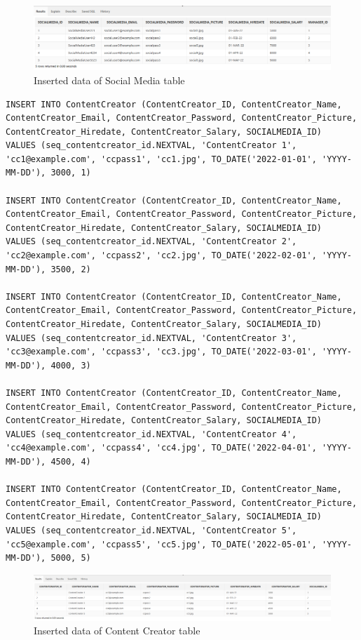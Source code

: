 \begin{figure}[H]
    \centering
    \includegraphics[width=1\textwidth]{images/TableData/SOCIALMEDIA.png}
    \caption{Inserted data of Social Media table}
\end{figure}
\clearpage
\begin{lstlisting}[caption={Inserting data into ContentCreator tables},label={lst:insert_ContentCreator}]
INSERT INTO ContentCreator (ContentCreator_ID, ContentCreator_Name, ContentCreator_Email, ContentCreator_Password, ContentCreator_Picture, ContentCreator_Hiredate, ContentCreator_Salary, SOCIALMEDIA_ID)
VALUES (seq_contentcreator_id.NEXTVAL, 'ContentCreator 1', 'cc1@example.com', 'ccpass1', 'cc1.jpg', TO_DATE('2022-01-01', 'YYYY-MM-DD'), 3000, 1)

INSERT INTO ContentCreator (ContentCreator_ID, ContentCreator_Name, ContentCreator_Email, ContentCreator_Password, ContentCreator_Picture, ContentCreator_Hiredate, ContentCreator_Salary, SOCIALMEDIA_ID)
VALUES (seq_contentcreator_id.NEXTVAL, 'ContentCreator 2', 'cc2@example.com', 'ccpass2', 'cc2.jpg', TO_DATE('2022-02-01', 'YYYY-MM-DD'), 3500, 2)

INSERT INTO ContentCreator (ContentCreator_ID, ContentCreator_Name, ContentCreator_Email, ContentCreator_Password, ContentCreator_Picture, ContentCreator_Hiredate, ContentCreator_Salary, SOCIALMEDIA_ID)
VALUES (seq_contentcreator_id.NEXTVAL, 'ContentCreator 3', 'cc3@example.com', 'ccpass3', 'cc3.jpg', TO_DATE('2022-03-01', 'YYYY-MM-DD'), 4000, 3)

INSERT INTO ContentCreator (ContentCreator_ID, ContentCreator_Name, ContentCreator_Email, ContentCreator_Password, ContentCreator_Picture, ContentCreator_Hiredate, ContentCreator_Salary, SOCIALMEDIA_ID)
VALUES (seq_contentcreator_id.NEXTVAL, 'ContentCreator 4', 'cc4@example.com', 'ccpass4', 'cc4.jpg', TO_DATE('2022-04-01', 'YYYY-MM-DD'), 4500, 4)

INSERT INTO ContentCreator (ContentCreator_ID, ContentCreator_Name, ContentCreator_Email, ContentCreator_Password, ContentCreator_Picture, ContentCreator_Hiredate, ContentCreator_Salary, SOCIALMEDIA_ID)
VALUES (seq_contentcreator_id.NEXTVAL, 'ContentCreator 5', 'cc5@example.com', 'ccpass5', 'cc5.jpg', TO_DATE('2022-05-01', 'YYYY-MM-DD'), 5000, 5)
\end{lstlisting}
\begin{figure}[H]
    \centering
    \includegraphics[width=1\textwidth]{images/TableData/CONTENTCREATOR.png}
    \caption{Inserted data of Content Creator table}
\end{figure}


